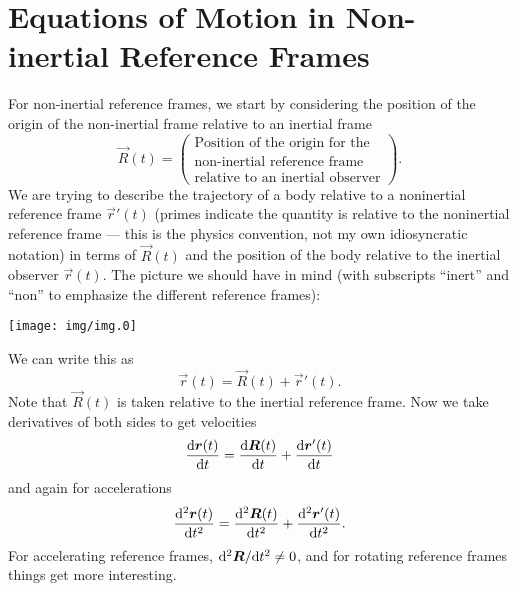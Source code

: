 \section{Equations of Motion in Non-inertial Reference Frames}\label{section:eom-in-non-inertial-frame}

\M
For non-inertial reference frames, we start by considering the position
of the origin of the non-inertial frame relative to an inertial frame
\begin{equation}
  \vec{R}(t) = \begin{pmatrix}\mbox{Position of the origin for the}\\
    \mbox{non-inertial reference frame}\\
    \mbox{relative to an inertial observer}
\end{pmatrix}.
\end{equation}
We are trying to describe the trajectory of a body relative to a
noninertial reference frame $\vec{r}'(t)$ (primes indicate the quantity
is relative to the noninertial reference frame --- this is the physics
convention, not my own idiosyncratic notation) in terms of $\vec{R}(t)$
and the position of the body relative to the inertial observer
$\vec{r}(t)$. The picture we should have in mind (with subscripts
``inert'' and ``non'' to emphasize the different reference frames):
\begin{center}
  \texttt{[image: img/img.0]}
\end{center}
We can write this as
\begin{equation}
\vec{r}(t) = \vec{R}(t) + \vec{r}'(t).
\end{equation}
Note that $\vec{R}(t)$ is taken relative to the inertial reference frame.
Now we take derivatives of both sides to get velocities
\begin{equation}
\frac{\mathrm{d}\boldsymbol{r}(t)}{\mathrm{d} t} = \frac{\mathrm{d}\boldsymbol{R}(t)}{\mathrm{d} t} + \frac{\mathrm{d}\boldsymbol{r}'(t)}{\mathrm{d} t}
\end{equation}
and again for accelerations
\begin{equation}
\frac{\mathrm{d}^{2}\boldsymbol{r}(t)}{\mathrm{d} t^{2}} = \frac{\mathrm{d}^{2}\boldsymbol{R}(t)}{\mathrm{d} t^{2}} + \frac{\mathrm{d}^{2}\boldsymbol{r}'(t)}{\mathrm{d} t^{2}}.
\end{equation}
For accelerating reference frames, $\mathrm{d}^{2}\boldsymbol{R}/\mathrm{d} t^{2}\neq0$, and
for rotating reference frames things get more interesting.

